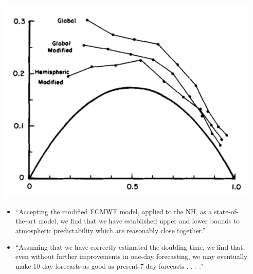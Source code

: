 \documentclass[aspectratio=169]{beamer}
\begin{document}
\begin{frame}

\begin{center}
\includegraphics[height = 0.5\textheight]{figures/lorenz_atmospheric_1982_fig5}
\end{center}

\begin{itemize}
\item ``Accepting the modified ECMWF model, applied to the NH, as a state-of-the-art model, we find that we have established upper and lower bounds to atmospheric predictability which are reasonably close together.''
\pause
\item ``Assuming that we have correctly estimated the doubling time, we find that, even without further improvements in one-day forecasting, we may eventually make 10 day forecasts as good as present 7 day forecasts . . . .''
\end{itemize}

\end{frame}
\end{document}
